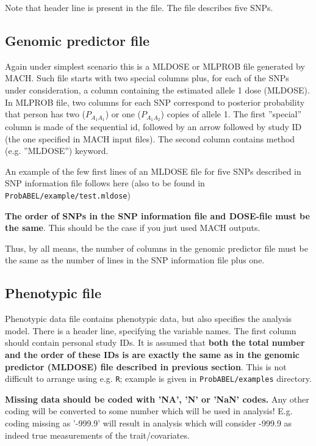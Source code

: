 \documentclass[12pt]{article}
\begin{document}
Note that header line is present in the file. The file describes 
five SNPs. 

\subsection{Genomic predictor file}
\label{ssec:dosein}

Again under simplest scenario this is a MLDOSE or MLPROB file generated by MACH.
Such file starts with two special columns plus, for each of the SNPs 
under consideration, a column containing the estimated allele 1 dose (MLDOSE).
In MLPROB file, two columns for each SNP correspond to posterior probability 
that person has two ($P_{A_1A_1}$) or one ($P_{A_1A_2}$) copies of allele 1. 
The first ''special'' column is made of the sequential id, 
followed by an arrow followed by study ID (the one specified in 
MACH input files). The second column contains method 
(e.g. ''MLDOSE'') keyword.

An example of the few first lines of an MLDOSE file for 
five SNPs described in SNP information file follows here (also 
to be found in \texttt{ProbABEL/example/test.mldose})



\textbf{The order of SNPs in the SNP information file and DOSE-file
must be the same}. This should be the case if you just used MACH outputs.

Thus, by all means, the number of columns in the genomic predictor file 
must be the same as the number of lines in the SNP information file plus one. 

\subsection{Phenotypic file}
\label{ssec:phenoin}

Phenotypic data file contains phenotypic data, but also specifies the 
analysis model. There is a header line, specifying the variable names. 
The first column should contain personal study IDs. It is assumed 
that \textbf{both the total number and the order of these IDs is are 
exactly the same as in the genomic predictor (MLDOSE) file described in 
previous section}. This is not difficult to arrange using e.g. \texttt{R}; 
example is given in \texttt{ProbABEL/examples} directory. 

\textbf{Missing data should be coded with 'NA', 'N' or 'NaN' codes.} Any 
other coding will be converted to some number which will be used in 
analysis! E.g. coding missing as '-999.9' will result in analysis which 
will consider -999.9 as indeed true measurements of the trait/covariates.  
\end{document}
